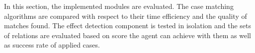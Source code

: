 In this section, the implemented modules are evaluated. The case matching algorithms are compared with respect to their time efficiency and the quality of matches found.
The effect detection component is tested in isolation and the sets of relations are evaluated based on score the agent can achieve with them as well as success rate of applied cases.

